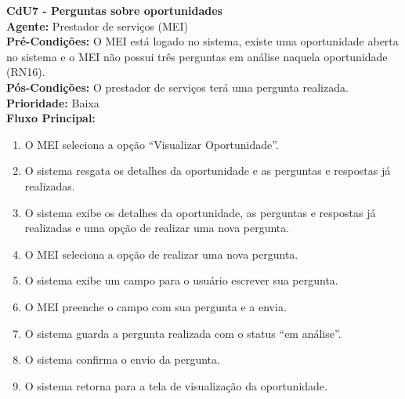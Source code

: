 \vspace{7pt}
\noindent\textbf{\normalsize CdU7 - Perguntas sobre oportunidades}\\
\noindent\textbf{Agente:} Prestador de serviços (MEI)\\ 
\textbf{Pré-Condições:} O MEI está logado no sistema, existe uma oportunidade aberta no sistema e o MEI não possui três perguntas em análise naquela oportunidade (RN16).\\ 
\textbf{Pós-Condições:} O prestador de serviços terá uma pergunta realizada.\\
\textbf{Prioridade:} Baixa \vspace{3pt}\\
\noindent\textbf{Fluxo Principal:}
\begin{enumerate}[noitemsep, topsep=-5pt, parsep=0pt]
    \item O MEI seleciona a opção ``Visualizar Oportunidade''.
    \item O sistema resgata os detalhes da oportunidade e as perguntas e respostas já realizadas.
    \item O sistema exibe os detalhes da oportunidade, as perguntas e respostas já realizadas e uma opção de realizar uma nova pergunta.
    \item O MEI seleciona a opção de realizar uma nova pergunta.
    \item O sistema exibe um campo para o usuário escrever sua pergunta.
    \item O MEI preenche o campo com sua pergunta e a envia.
    \item O sistema guarda a pergunta realizada com o status ``em análise''.
    \item O sistema confirma o envio da pergunta.
    \item O sistema retorna para a tela de visualização da oportunidade.
\end{enumerate}


